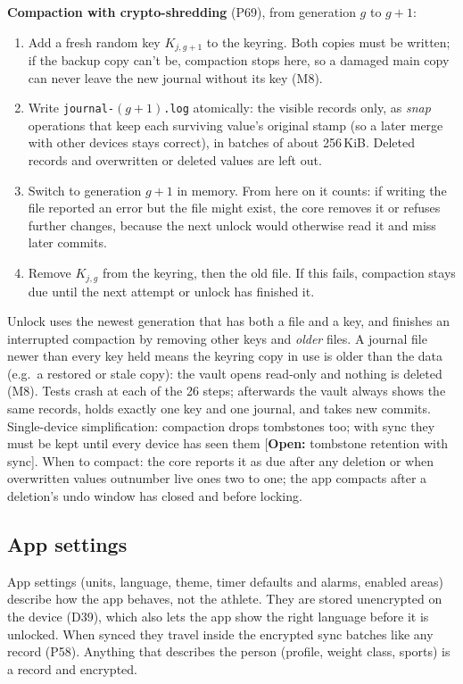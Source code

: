 \documentclass[11pt,a4paper]{article}
\newcommand{\todo}[1]{\textcolor{red!70!black}{[\textbf{Open:} #1]}}
\newcommand{\dref}[1]{\textsf{#1}} %
\begin{document}
\noindent\textbf{Compaction with crypto-shredding} (\dref{P69}), from generation $g$ to $g + 1$:
\begin{enumerate}
  \item Add a fresh random key $K_{j,g+1}$ to the keyring. Both copies must be written; if the backup copy can't be, compaction stops here, so a damaged main copy can never leave the new journal without its key (M8).
  \item Write \texttt{journal-}$(g{+}1)$\texttt{.log} atomically: the visible records only, as \emph{snap} operations that keep each surviving value's original stamp (so a later merge with other devices stays correct), in batches of about 256\,KiB. Deleted records and overwritten or deleted values are left out.
  \item Switch to generation $g + 1$ in memory. From here on it counts: if writing the file reported an error but the file might exist, the core removes it or refuses further changes, because the next unlock would otherwise read it and miss later commits.
  \item Remove $K_{j,g}$ from the keyring, then the old file. If this fails, compaction stays due until the next attempt or unlock has finished it.
\end{enumerate}
Unlock uses the newest generation that has both a file and a key, and finishes an interrupted compaction by removing other keys and \emph{older} files. A journal file newer than every key held means the keyring copy in use is older than the data (e.g.\ a restored or stale copy): the vault opens read-only and nothing is deleted (M8). Tests crash at each of the 26 steps; afterwards the vault always shows the same records, holds exactly one key and one journal, and takes new commits. Single-device simplification: compaction drops tombstones too; with sync they must be kept until every device has seen them \todo{tombstone retention with sync}. When to compact: the core reports it as due after any deletion or when overwritten values outnumber live ones two to one; the app compacts after a deletion's undo window has closed and before locking.

\subsection{App settings}
App settings (units, language, theme, timer defaults and alarms, enabled areas) describe how the app behaves, not the athlete. They are stored unencrypted on the device (\dref{D39}), which also lets the app show the right language before it is unlocked. When synced they travel inside the encrypted sync batches like any record (\dref{P58}). Anything that describes the person (profile, weight class, sports) is a record and encrypted.
\end{document}
